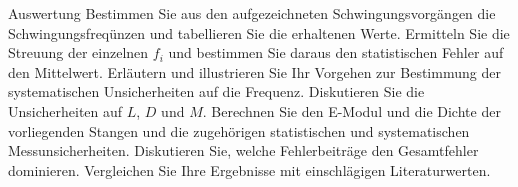 \documentclass[twoside]{protokoll}
\begin{document}
\begin{aufgabe}{Auswertung}
  Bestimmen Sie aus den aufgezeichneten Schwingungsvorgängen die
  Schwingungsfreqünzen und tabellieren Sie die erhaltenen
  Werte. Ermitteln Sie die Streuung der einzelnen $f_i$ und bestimmen
  Sie daraus den statistischen Fehler auf den Mittelwert. Erläutern
  und illustrieren Sie Ihr Vorgehen zur Bestimmung der systematischen
  Unsicherheiten auf die Frequenz. Diskutieren Sie die Unsicherheiten
  auf $L$, $D$ und $M$. Berechnen Sie den E-Modul und die Dichte der
  vorliegenden Stangen und die zugehörigen statistischen und
  systematischen Messunsicherheiten. Diskutieren Sie, welche
  Fehlerbeiträge den Gesamtfehler dominieren. Vergleichen Sie Ihre
  Ergebnisse mit einschlägigen Literaturwerten.
\end{aufgabe}
 
\end{document}
